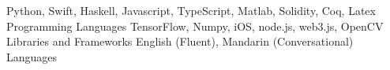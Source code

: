 \begin{cventries}
  \cvsmallentry
    {Python, Swift, Haskell, Javascript, TypeScript, Matlab, Solidity, Coq, Latex}
    {Programming Languages}
    {}
    {}
    {}
  \cvsmallentry
    {TensorFlow, Numpy, iOS, node.js, web3.js, OpenCV}
    {Libraries and Frameworks}
    {}
    {}
    {}
  \cvsmallentry
    {English (Fluent), Mandarin (Conversational)}
    {Languages}
    {}
    {}
    {}
\end{cventries}


